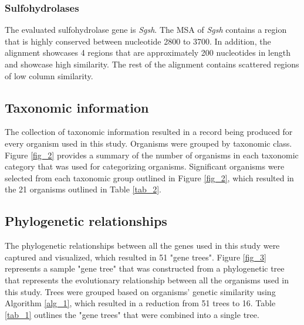 \documentclass{article}
\begin{document}
\subsubsection{Sulfohydrolases}
The evaluated sulfohydrolase gene is \textit{Sgsh}. The MSA of \textit{Sgsh} contains a region that is highly conserved between nucleotide 2800 to 3700. In addition, the alignment showcases 4 regions that are approximately 200 nucleotides in length and showcase high similarity. The rest of the alignment contains scattered regions of low column similarity. 

\subsection{Taxonomic information}
The collection of taxonomic information resulted in a record being produced for every organism used in this study. Organisms were grouped by taxonomic class. Figure \ref{fig_2} provides a summary of the number of organisms in each taxonomic category that was used for categorizing organisms. Significant organisms were selected from each taxonomic group outlined in Figure \ref{fig_2}, which resulted in the 21 organisms outlined in Table \ref{tab_2}.

\subsection{Phylogenetic relationships}
The phylogenetic relationships between all the genes used in this study were captured and visualized, which resulted in 51 "gene trees". Figure \ref{fig_3} represents a sample "gene tree" that was constructed from a phylogenetic tree that represents the evolutionary relationship between all the organisms used in this study. Trees were grouped based on organisms' genetic similarity using Algorithm \ref{alg_1}, which resulted in a reduction from 51 trees to 16. Table \ref{tab_1} outlines the "gene trees" that were combined into a single tree.
\end{document}
